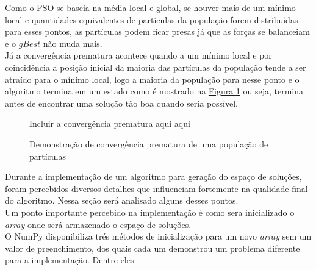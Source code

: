Como o PSO se baseia na média local e global, se houver mais de um mínimo local e quantidades equivalentes de partículas da população forem distribuídas para esses pontos, as partículas podem ficar presas já que as forças se balanceiam e o $gBest$ não muda mais.\\
%
\indent Já a convergência prematura acontece quando a um mínimo local e por coincidência a posição inicial da maioria das partículas da população tende a ser atraído para o mínimo local, logo a maioria da população para nesse ponto e o algoritmo termina em um estado como é mostrado na 
\hyperref[fig:convergencia-prematura]{Figura \ref{fig:convergencia-prematura}} 
ou seja, termina antes de encontrar uma solução tão boa quando seria possível.\\
\begin{figure}[ht]
    \centering
    \small{Incluir a convergência prematura aqui aqui}
    \caption{Demonstração de convergência prematura de uma população de partículas}
    \label{fig:convergencia-prematura}
\end{figure}
\indent Durante a implementação de um algoritmo para geração do espaço de soluções, foram percebidos diversos detalhes que influenciam fortemente na qualidade final do algoritmo. Nessa seção será analisado alguns desses pontos.\\
\indent Um ponto importante percebido na implementação é como sera inicializado o \textit{array} onde será armazenado o espaço de soluções.\\
\indent O NumPy disponibiliza trés métodos de inicialização para um novo \textit{array} sem um valor de preenchimento, dos quais cada um demonstrou um problema diferente para a implementação. Dentre eles: 
